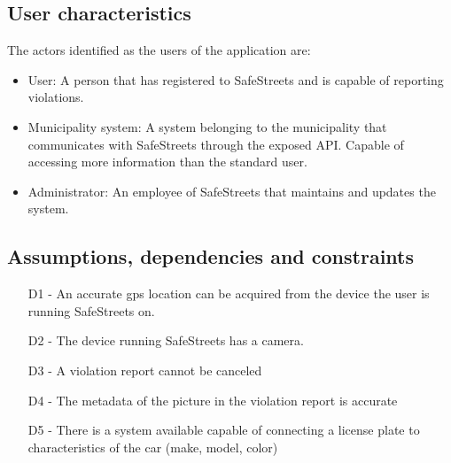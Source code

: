 \subsection{User characteristics}
The actors identified as the users of the application are:
\begin{itemize}
\item
User: A person that has registered to SafeStreets and is capable of reporting violations. 
\item
Municipality system: A system belonging to the municipality that communicates with SafeStreets through the exposed API. Capable of accessing more information than the standard user.
\item
Administrator: An employee of SafeStreets that maintains and updates the system.
\end{itemize}

\subsection{Assumptions, dependencies and constraints}

\begin{itemize}
\item
[D1] - An accurate gps location can be acquired from the device the user is running SafeStreets on.
\item
[D2] - The device running SafeStreets has a camera.
\item
[D3] - A violation report cannot be canceled
\item
[D4] - The metadata of the picture in the violation report is accurate
\item
[D5] - There is a system available capable of connecting a license plate to characteristics of the car (make, model, color)
\end{itemize}




